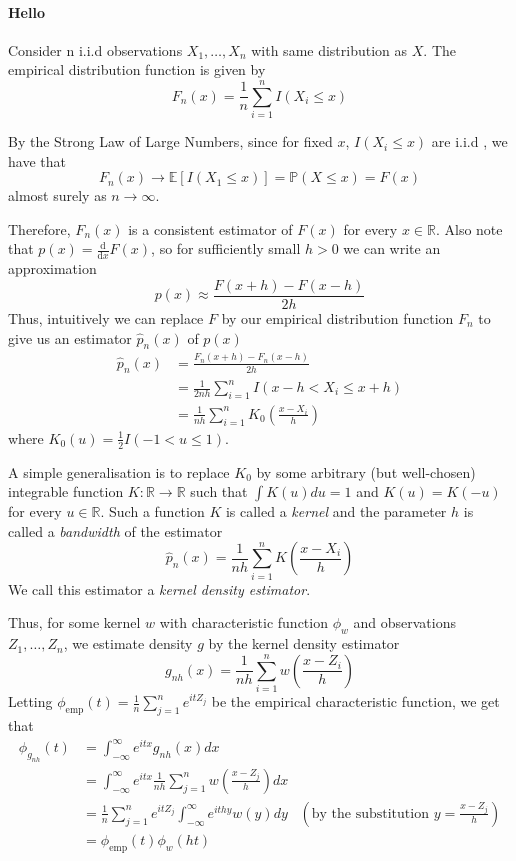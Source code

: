 \documentclass[a4paper,11pt]{article}
\theoremstyle{theorem}
\theoremstyle{definition}
\theoremstyle{remark}
\providecommand{\E}{\mathbb{E}}
\begin{document}
\paragraph{Hello}

Consider n i.i.d observations $X_{1}, \dotsc , X_{n}$ with same distribution as $X$. The empirical distribution function is given by 
\[
F_{n}(x) = \frac{1}{n}\sum_{i=1}^{n}{I(X_{i} \leq x)}
\]  

By the Strong Law of Large Numbers, since for fixed $x$, $I(X_{i} \leq x)$ are i.i.d , we have that
\[
F_{n}(x) \to \E \left[ I(X_{1} \leq x) \right] = \mathbb{P}(X \leq x) = F(x)
\]
almost surely as $n \to \infty$.

Therefore, $F_{n}(x)$ is a consistent estimator of $F(x)$ for every $x \in \mathbb{R}$. Also note that $p(x) = \frac{\mathrm{d}}{\mathrm{d}x}F(x)$, so for sufficiently small $h > 0$ we can write an approximation
\[
p(x) \approx \frac{F(x+h) - F(x-h)}{2h}
\]
Thus, intuitively we can replace $F$ by our empirical distribution function $F_{n}$ to give us an estimator $\hat{p}_{n}(x)$ of $p(x)$
\begin{align*}
\hat{p}_{n}(x) &= \frac{F_{n}(x+h) - F_{n}(x-h)}{2h} \\
               &= \frac{1}{2nh}\sum_{i=1}^{n}{I(x - h < X_{i} \leq x + h)} \\
               &= \frac{1}{nh}\sum_{i=1}^{n}{K_{0}\left(\frac{x - X_{i}}{h}\right)}
\end{align*}
where $K_{0}(u) = \frac{1}{2}I(-1 < u \leq 1)$.

A simple generalisation is to replace $K_{0}$ by some arbitrary (but well-chosen) integrable function $K : \mathbb{R} \to \mathbb{R}$ such that $\int{K(u)}du = 1$ and $K(u) = K(-u)$ for every $u \in \mathbb{R}$. Such a function $K$ is called a \textit{kernel} and the parameter $h$ is called a \textit{bandwidth} of the estimator
\begin{equation} \label{kde}
\hat{p}_{n}(x) = \frac{1}{nh}\sum_{i=1}^{n}{K\left(\frac{x - X_{i}}{h}\right)}
\end{equation}
We call this estimator a \textit{kernel density estimator}.

Thus, for some kernel $w$ with characteristic function $\phi_{w}$ and observations $Z_{1}, \dotsc , Z_{n}$, we estimate density $g$ by the kernel density estimator
\[
g_{nh}(x) = \frac{1}{nh}\sum_{i=1}^{n}{w\left(\frac{x - Z_{i}}{h}\right)}
\]
Letting $\phi_{\text{emp}}(t) = \frac{1}{n}\sum_{j=1}^{n}{e^{itZ_{j}}}$ be the empirical characteristic function, we get that
\begin{align*} \label{charformula}
\phi_{g_{nh}}(t) &= \int_{-\infty}^{\infty}{e^{itx}g_{nh}(x)}dx \\
                 &= \int_{-\infty}^{\infty}{e^{itx}\frac{1}{nh}\sum_{j=1}^{n}{w\left(\frac{x - Z_{j}}{h}\right)}}dx \\
                 &= \frac{1}{n}\sum_{j=1}^{n}{e^{itZ_{j}}}\int_{-\infty}^{\infty}{e^{ithy}w(y)}dy &\left(\text{by the substitution } y = \frac{x - Z_{j}}{h} \right) \\
                 &= \phi_{\text{emp}}(t)\phi_{w}(ht)
\end{align*}
\end{document}
